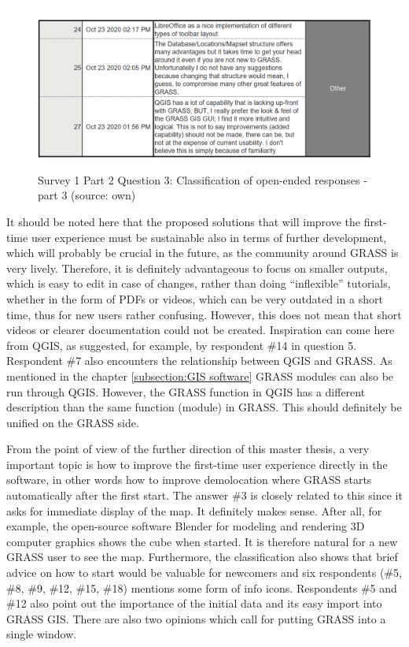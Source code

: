 \documentclass[a4paper,10pt,twoside]{article}
\begin{document}
\newpage
\vspace{0.3cm}
\begin{figure}[hbt!] 
\begin{center}
\includegraphics[width=15cm]{../surveys/analyzed_data/survey1_part2_question3_open_ended-2_1} 
\caption[Survey 1 Part 2 Question 3: Classification of open-ended responses - part 3]{Survey 1 Part 2 Question 3: Classification of open-ended responses - part 3 (source: own)}
\label{fig:survey1_part2_question3_open_ended3_1}
\end{center}
\end{figure}

\noindent  It should be noted here that the proposed solutions that will improve the first-time user experience must be sustainable also in terms of further development, which will probably be crucial in the future, as the community around GRASS is very lively. Therefore, it is definitely advantageous to focus on smaller outputs, which is easy to edit in case of changes, rather than doing ``inflexible'' tutorials, whether in the form of PDFs or videos, which can be very outdated in a short time, thus for new users rather confusing. However, this does not mean that short videos or clearer documentation could not be created. Inspiration can come here from QGIS, as suggested, for example, by respondent \#14 in question 5. Respondent \#7 also encounters the relationship between QGIS and GRASS. As mentioned in the chapter \ref{subsection:GIS software} GRASS modules can also be run through QGIS. However, the GRASS function in QGIS has a different description than the same function (module) in GRASS. This should definitely be unified on the GRASS side.
 
From the point of view of the further direction of this master thesis, a very important topic is how to improve the first-time user experience directly in the software, in other words how to improve demolocation where GRASS starts automatically after the first start. The answer \#3 is closely related to this since it asks for immediate display of the map. It definitely makes sense. After all, for example, the open-source software Blender for modeling and rendering 3D computer graphics shows the cube when started. It is therefore natural for a new GRASS user to see the map. Furthermore, the classification also shows that brief advice on how to start would be valuable for newcomers and six respondents (\#5, \#8, \#9, \#12, \#15, \#18) mentions some form of info icons. Respondents \#5 and \#12 also point out the importance of the initial data and its easy import into GRASS GIS. There are also two opinions which call for putting GRASS into a single window.
\end{document}
